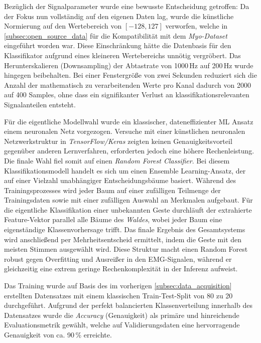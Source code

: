     Bezüglich der Signalparameter wurde eine bewusste Entscheidung getroffen: Da der Fokus nun vollständig auf den eigenen Daten lag, wurde die künstliche Normierung auf den Wertebereich von $[-128, 127]$ verworfen, welche in \autoref{subsec:open_source_data} für die Kompatibilität mit dem \textit{Myo-Dataset} eingeführt worden war. Diese Einschränkung hätte die Datenbasis für den Klassifikator aufgrund eines kleineren Wertebereichs unnötig vergröbert. Das Herunterskalieren (Downsampling) der Abtastrate von 1000\,Hz auf 200\,Hz wurde hingegen beibehalten. Bei einer Fenstergröße von zwei Sekunden reduziert sich die Anzahl der mathematisch zu verarbeitenden Werte pro Kanal dadurch von 2000 auf 400 Samples, ohne dass ein signifikanter Verlust an klassifikationsrelevanten Signalanteilen entsteht.

    Für die eigentliche Modellwahl wurde ein klassischer, dateneffizienter \acf{ML} Ansatz einem neuronalen Netz vorgezogen. Versuche mit einer künstlichen neuronalen Netzwerkstruktur in \textit{TensorFlow/Keras} zeigten keinen Genauigkeitsvorteil gegenüber anderen Lernverfahren, erforderten jedoch eine höhere Rechenleistung. Die finale Wahl fiel somit auf einen \textit{Random Forest Classifier}. Bei diesem Klassifikationsmodell handelt es sich um einen Ensemble Learning-Ansatz, der auf einer Vielzahl unabhängiger Entscheidungsbäume basiert. Während des Trainingsprozesses wird jeder Baum auf einer zufälligen Teilmenge der Trainingsdaten sowie mit einer zufälligen Auswahl an Merkmalen aufgebaut. Für die eigentliche Klassifikation einer unbekannten Geste durchläuft der extrahierte Feature-Vektor parallel alle Bäume des \textit{Waldes}, wobei jeder Baum eine eigenständige Klassenvorhersage trifft. Das finale Ergebnis des Gesamtsystems wird anschließend per Mehrheitsentscheid ermittelt, indem die Geste mit den meisten Stimmen ausgewählt wird. Diese Struktur macht einen Random Forest robust gegen Overfitting und Ausreißer in den \ac{EMG}-Signalen, während er gleichzeitig eine extrem geringe Rechenkomplexität in der Inferenz aufweist.

    Das Training wurde auf Basis des im vorherigen \autoref{subsec:data_acquisition} erstellten Datensatzes mit einem klassischen Train-Test-Split von 80 zu 20 durchgeführt. Aufgrund der perfekt balancierten Klassenverteilung innerhalb des Datensatzes wurde die \textit{Accuracy} (Genauigkeit) als primäre und hinreichende Evaluationsmetrik gewählt, welche auf Validierungsdaten eine hervorragende Genauigkeit von ca. 90\,\% erreichte.

